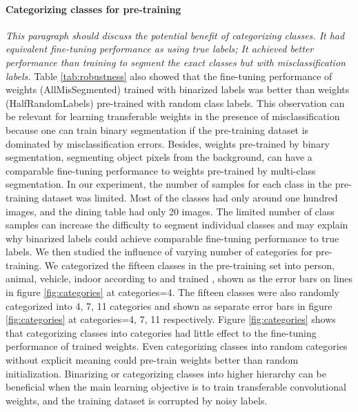 \paragraph{Categorizing classes for pre-training}
\noindent \textit{This paragraph should discuss the potential benefit of categorizing classes. It had equivalent fine-tuning performance as using true labels; It achieved better performance than training to segment the exact classes but with misclassification labels.}
\noindent
Table \ref{tab:robustness} also showed that the fine-tuning performance of weights (AllMisSegmented) trained with binarized labels was better than weights (HalfRandomLabels) pre-trained with random class labels.
This observation can be relevant for learning transferable weights in the presence of misclassification because one can train binary segmentation if the pre-training dataset is dominated by misclassification errors.
Besides, weights pre-trained by binary segmentation, segmenting object pixels from the background, can have a comparable fine-tuning performance to weights pre-trained by multi-class segmentation.
In our experiment, the number of samples for each class in the pre-training dataset was limited.
Most of the classes had only around one hundred images, and the dining table had only 20 images.
The limited number of class samples can increase the difficulty to segment individual classes and may explain why binarized labels could achieve comparable fine-tuning performance to true labels.
We then studied the influence of varying number of categories for pre-training.
We categorized the fifteen classes in the pre-training set into person, animal, vehicle, indoor according to \cite{everingham2015pascal} and trained , shown as the error bars on lines in figure \ref{fig:categories} at categories=4.
The fifteen classes were also randomly categorized into 4, 7, 11 categories and shown as separate error bars in figure \ref{fig:categories} at categories=4, 7, 11 respectively.
Figure \ref{fig:categories} shows that categorizing classes into categories had little effect to the fine-tuning performance of trained weights.
Even categorizing classes into random categories without explicit meaning could pre-train weights better than random initialization.
Binarizing or categorizing classes into higher hierarchy can be beneficial when the main learning objective is to train transferable convolutional weights, and the training dataset is corrupted by noisy labels.


